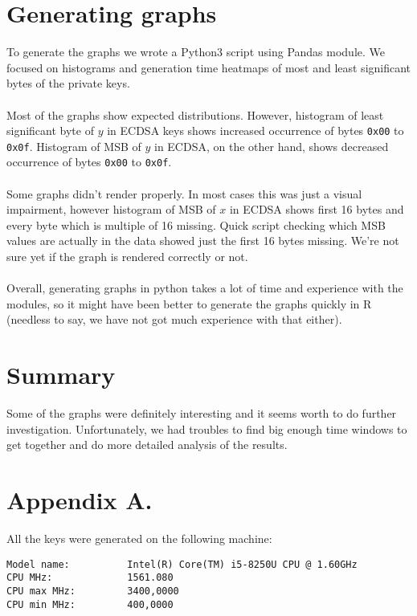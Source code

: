 \documentclass[a4paper]{scrartcl}
\begin{document}
\section{Generating graphs}
To generate the graphs we wrote a Python3 script using Pandas module. We
focused on histograms and generation time heatmaps of most and least
significant bytes of the private keys.
\\\\
Most of the graphs show expected distributions. However, histogram of least
significant byte of $y$ in ECDSA keys shows increased occurrence of bytes \verb+0x00+ to
\verb+0x0f+. Histogram of MSB of $y$ in ECDSA, on the other hand, shows decreased
occurrence of bytes \verb+0x00+ to \verb+0x0f+.
\\\\
Some graphs didn’t render properly. In most cases this was just a visual
impairment, however histogram of MSB of $x$ in ECDSA shows first 16 bytes and every
byte which is multiple of 16 missing. Quick script checking which MSB values
are actually in the data showed just the first 16 bytes missing. We’re not sure
yet if the graph is rendered correctly or not.
\\\\
Overall, generating graphs in python takes a lot of time and experience with
the modules, so it might have been better to generate the graphs quickly in
R (needless to say, we have not got much experience with that either).

\section{Summary}
Some of the graphs were definitely interesting and it seems worth to do further investigation. Unfortunately, we had troubles to find big enough time windows to get together and do more detailed analysis of the results.


\section{Appendix A.}
All the keys were generated on the following machine:
\begin{lstlisting}[caption=Hardware specifications of the machine generating the keys, captionpos=b]
Model name:          Intel(R) Core(TM) i5-8250U CPU @ 1.60GHz
CPU MHz:             1561.080
CPU max MHz:         3400,0000
CPU min MHz:         400,0000
\end{lstlisting}
\end{document}
